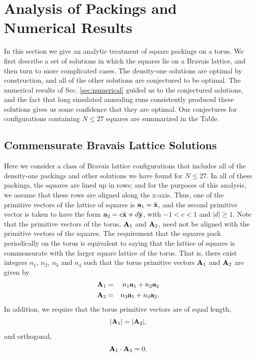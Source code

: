 \documentclass{umthesis}          %
\newcommand{\ax}{{\bf a}_1}
\newcommand{\ay}{{\bf a}_2}
\newcommand{\Ax}{{\bf A}_1}
\newcommand{\Ay}{{\bf A}_2}
\begin{document}
\section{Analysis of Packings and Numerical Results}
\label{sec:analytics}

In this section we give an analytic treatment of square packings on a torus.  We first describe a set of solutions in which the squares lie on a Bravais lattice, and then turn to more complicated cases. The density-one solutions are optimal by construction, and all of the other solutions are conjectured to be optimal. The numerical results of Sec. \ref{sec:numerical} guided us to the conjectured solutions, and the fact that long simulated annealing runs consistently produced these solutions gives us some confidence that they are optimal.  Our conjectures for configurations containing $N \leq 27$ squares are summarized in the Table.

\subsection{Commensurate Bravais Lattice Solutions}
Here we consider a class of Bravais lattice configurations that includes all of the density-one packings and other solutions we have found for  $N \leq 27$.   In all of these packings, the squares are lined up in rows; and for the purposes of this analysis, we assume that these rows are aligned along the x-axis. Thus, one of the primitive vectors of the lattice of squares is $\ax=\hat{{\bf x}}$, and the second primitive vector is taken to have the form $\ay=c \hat{{\bf x}} + d \hat{{\bf y}}$, with $-1< c <1$ and  $|d|\geq 1$.  Note that the primitive vectors of the torus, $\Ax$ and $\Ay$, need not be aligned with the primitive vectors of the squares.     The requirement that the squares pack periodically on the torus is equivalent to saying that the lattice of squares is commensurate with the larger square lattice of the torus.  That is, there exist  integers $n_1$, $n_2$, $n_3$ and $n_4$ such that the torus primitive vectors $\Ax$ and $\Ay$ are given by
\begin{eqnarray} 
\label{eqn:Ana}
\Ax&=& n_1 \ax + n_2 \ay \nonumber \\ 
\Ay&=&n_3 \ax + n_4 \ay.
\end{eqnarray}
In addition, we require that the torus primitive vectors are of equal length,
\begin{equation}
\label{eqn:normal}
|\Ax|=|\Ay| ,
\end{equation}
and orthogonal,
\begin{equation}
\label{eqn:ortho}
\Ax \cdot \Ay = 0 .
\end{equation}
\end{document}
